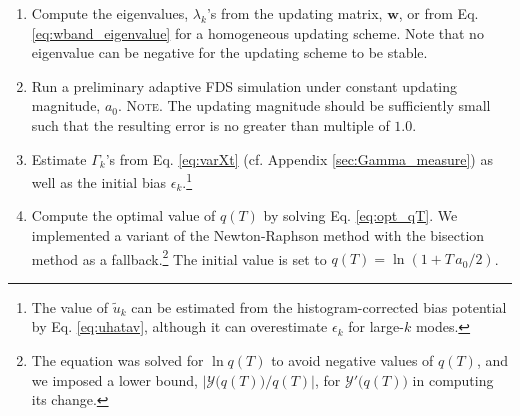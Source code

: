 \documentclass[reprint, superscriptaddress, floatfix]{revtex4-1}
\newcommand{\note}[1]{{\color{DarkGreen}\footnotesize \textsc{Note.} #1}}
\begin{document}
\begin{enumerate}

\item
Compute the eigenvalues, $\lambda_k$'s
from the updating matrix, $\mathbf w$,
or from Eq. \eqref{eq:wband_eigenvalue}
for a homogeneous updating scheme.
%
Note that
no eigenvalue can be negative for the updating scheme to be stable.

\item \label{step:prerun}
Run a preliminary adaptive FDS simulation
under constant updating magnitude, $a_0$.
%
\note{The updating magnitude should be sufficiently small
  such that the resulting error is no greater than
  multiple of $1.0$.}

\item \label{step:Gamma}
Estimate $\Gamma_k$'s from Eq. \eqref{eq:varXt}
(cf. Appendix \ref{sec:Gamma_measure})
as well as the initial bias $\epsilon_k$.\footnote{The
  value of $\tilde u_k$ can be estimated
  from the histogram-corrected bias potential
  by Eq. \eqref{eq:uhatav},
  although it can overestimate
  $\epsilon_k$ for large-$k$ modes.
}

\item \label{step:qT}
Compute the optimal value of $q(T)$ by solving Eq. \eqref{eq:opt_qT}.
%
We implemented a variant of the Newton-Raphson method\cite{press3rd}
with the bisection method\cite{press3rd}
as a fallback.\footnote{
The equation was solved for $\ln q(T)$
to avoid negative values of $q(T)$,
and we imposed a lower bound,
$\bigl|\mathcal Y\bigl(q(T)\bigr)/q(T)\bigr|$, for
$\mathcal Y'\bigl(q(T)\bigr)$
in computing its change.
}
The initial value is set to $q(T) = \ln(1+T\,a_0/2)$.
%


\end{enumerate}
\end{document}
